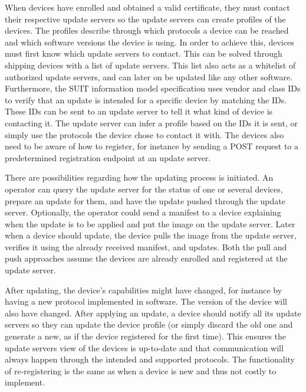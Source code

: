 \documentclass[0-thesis.tex]{subfiles}
\begin{document}
When devices have enrolled and obtained a valid certificate, they must contact their
respective update servers so the update servers can create profiles of the devices. The
profiles describe through which protocols a device can be reached and which software
versions the device is using. In order to achieve this, devices must first know which
update servers to contact. This can be solved through shipping devices with a list of
update servers. This list also acts as a whitelist of authorized update servers, and can
later on be updated like any other software. Furthermore, the SUIT information model
specification uses vendor and class IDs to verify that an update is intended for a
specific device by matching the IDs. These IDs can be sent to an update server to tell it
what kind of device is contacting it. The update server can infer a profile based on the
IDs it is sent, or simply use the protocols the device chose to contact it with. The
devices also need to be aware of how to register, for instance by sending a  POST request
to a predetermined registration endpoint at an update server. 

There are possibilities regarding how the updating process is initiated. An operator can
query the update server for the status of one or several devices, prepare an update for
them, and have the update pushed through the update server. Optionally, the operator could
send a manifest to a device explaining when the update is to be applied and put the image
on the update server. Later when a device should update, the device pulls the image from
the update server, verifies it using the already received manifest, and updates. Both the
pull and push approaches assume the devices are already enrolled and registered at the
update server.

After updating, the device's capabilities might have changed, for instance by having a new
protocol implemented in software. The version of the device will also have changed. After
applying an update, a device should notify all its update servers so they can update the
device profile (or simply discard the old one and generate a new, as if the device
registered for the first time). This ensures the update servers view of the devices is
up-to-date and that communication will always happen through the intended and supported
protocols. The functionality of re-registering is the same as when a device is new and
thus not costly to implement.
\end{document}
